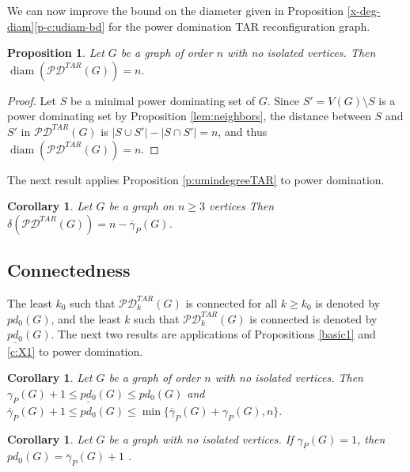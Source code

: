 \documentclass{article}
\numberwithin{figure}{section}   %
\newtheorem{cor}[thm]{Corollary}
\newtheorem{prop}[thm]{Proposition}
\theoremstyle{definition}
\theoremstyle{definition}
\theoremstyle{definition}
\newcommand{\ol}{\overline}
\newcommand{\diam}{\operatorname{diam}}
\newcommand{\pd}{\gamma_P}
\newcommand{\pdbar}{\ol\pd}
\newcommand{\tar}{\mathscr{PD}^{TAR}}
\newcommand{\pdo}{pd_0}
\newcommand{\ulpdo}{\underline{pd_0}}
\newcommand{\df}[1]{{\textcolor{red}{[}\textcolor{red}{{DF: \em #1}]}}}
\begin{document}
We can now improve the bound on the diameter given in  Proposition \ref{x-deg-diam}\eqref{p-c:udiam-bd} for the power domination TAR reconfiguration graph.
\begin{prop}\label{lem:diameterbounds}
Let $G$ be a graph of order $n$ with no isolated vertices. Then $\diam(\tar(G))=n$.
\end{prop} 

\begin{proof}  Let $S$ be a minimal power dominating set of $G$.  Since $S'=V(G)\setminus S$  is a power dominating set by Proposition \ref{lem:neighbors}, the distance between $S$ and $S'$ in $\tar(G)$ is $|S\cup S'|-|S\cap S'|=n$, and thus $\diam(\tar(G))=n.$
\end{proof}

The next result applies Proposition \ref{p:umindegreeTAR} to power domination.
\begin{cor}\label{p:mindegreeTAR}
Let $G$ be a graph on $n\geq3$ vertices %
Then  $\delta(\tar(G))=n-\pdbar(G)$.
\end{cor}



\subsection{Connectedness}


The least $k_0$ such that $\tar_k(G)$ is connected for all $k\ge k_0$ is denoted by $\pdo(G)$, and the least $k$ such that $\tar_k(G)$ is connected is denoted by $\ulpdo(G)$.
The next two results are applications of Propositions \ref{basic1} and \ref{c:X1} to power domination.

\begin{cor}\label{basic1-pd} 
Let $G$ be a graph of order $n$ with no isolated vertices. Then $\pd(G)+1\le \ulpdo(G)\le\pdo(G)$ and $\pdbar(G)+1\le \pdo(G)\le\min\{\pdbar(G)+\pd(G),n\}.$  %
\end{cor}


\begin{cor}\label{c:pd1}
Let $G$ be a graph with no isolated vertices. If $\pd(G)=1$, then $\pdo(G)=\pdbar(G)+1$ . 
\end{cor}
\end{document}
